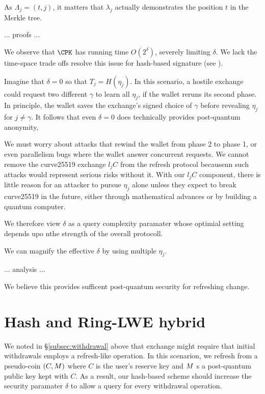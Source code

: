 \documentclass{llncs}
\begin{document}
As $\Lambda_j = (t,j)$, it matters that $\lambda_j$ actually
demonstrates the position $t$ in the Merkle tree.

... proofs ...

\smallskip

We observe that $\CPK$ has running time $O(2^\delta)$, severely
limiting $\delta$.  We lack the time-space trade offs resolve
this issue for hash-based signature (see \cite{SPHINCS}).

Imagine that $\delta = 0$ so that $T_j = H(\eta_j)$.
In this scenario, a hostile exchange could request two different
$\gamma$ to learn all $\eta_j$, if the wallet reruns its second
phase.  In principle, the wallet saves the exchange's signed 
choice of $\gamma$ before revealing $\eta_j$ for $j \neq \gamma$.
It follows that even $\delta = 0$ does technically provides
post-quantum anonymity,

We must worry about attacks that rewind the wallet from phase 2 to
phase 1, or even parallelism bugs where the wallet answer concurrent
requests.  We cannot remove the curve25519 exchange $l_j C$ from the
refresh protocol becausenn such attacks would represent serious risks
without it.  With our $l_j C$ component, there is little reason for
an attacker to pursue $\eta_j$ alone unless they expect to break
curve25519 in the future, either through mathematical advances or
by building a quantum computer.  

We therefore view $\delta$ as a query complexity paramater whose 
optimial setting depends upo nthe strength of the overall protocoll. 

\smallskip

We can magnify the effective $\delta$ by using multiple $\eta_j$.

... analysis ...

We believe this provides sufficent post-quantum security for
refreshing change.  


\section{Hash and Ring-LWE hybrid}

We noted in \S\ref{subsec:withdrawal} above that exchange might
require that initial withdrawals employs a refresh-like operation.
In this scenarion, we refresh from a pseudo-coin $(C,M)$ where
 $C$ is the user's reserve key \cite[??]{Taler} and
 $M$ s a post-quantum public key kept with $C$.
As a result, our hash-based scheme should increase the security
paramater $\delta$ to allow a query for every  withdrawal operation.
\end{document}
